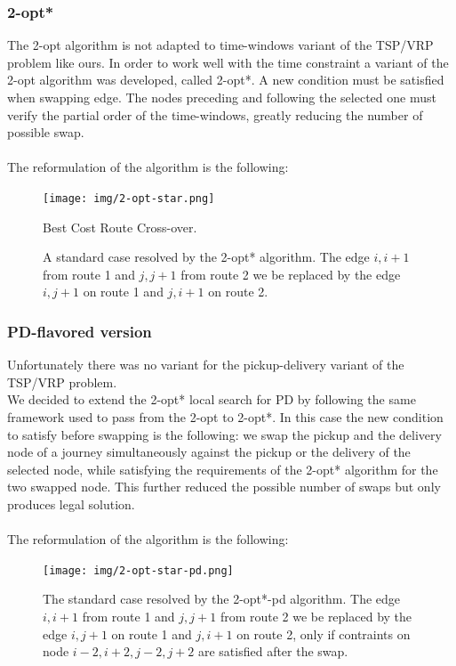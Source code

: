 \documentclass[12pt]{memoir}
\begin{document}
\subsubsection{2-opt*}
The 2-opt algorithm is not adapted to time-windows variant of the TSP/VRP problem like ours.
In order to work well with the time constraint a variant of the 2-opt algorithm was developed,
called 2-opt*. A new condition must be satisfied when swapping edge. The nodes preceding and
following the selected one must verify the partial order of the time-windows, greatly reducing
the number of possible swap.\\
\\
The reformulation of the algorithm is the following:
\begin{figure}[htbp]
	\begin{center}
		\texttt{[image: img/2-opt-star.png]}
		\caption{Best Cost Route Cross-over.}
		\caption{A standard case resolved by the 2-opt* algorithm. The edge $i,i+1$ from
    route 1 and $j,j+1$ from route 2 we be replaced by the edge $i,j+1$ on route 1
    and $j,i+1$ on route 2.}
	\end{center}
\end{figure}
\subsubsection{PD-flavored version}
Unfortunately there was no variant for the pickup-delivery variant of the TSP/VRP problem.\\
We decided to extend the 2-opt* local search for PD by following the same framework used to
pass from the 2-opt to 2-opt*. In this case the new condition to satisfy before swapping is
the following: we swap the pickup and the delivery node of a journey simultaneously against the
pickup or the delivery of the selected node, while satisfying the requirements of the 2-opt*
algorithm for the two swapped node. This further reduced the possible number of swaps but only
produces legal solution.\\
\\
The reformulation of the algorithm is the following:
\\
\begin{figure}[htbp]
	\begin{center}
		\texttt{[image: img/2-opt-star-pd.png]}
		\caption{The  standard case resolved by the 2-opt*-pd algorithm. The edge $i,i+1$ from
    route 1 and $j,j+1$ from route 2 we be replaced by the edge $i,j+1$ on route 1
    and $j,i+1$ on route 2, only if contraints on node $i-2,i+2,j-2,j+2$ are
    satisfied after the swap.}
	\end{center}
\end{figure}
\end{document}

